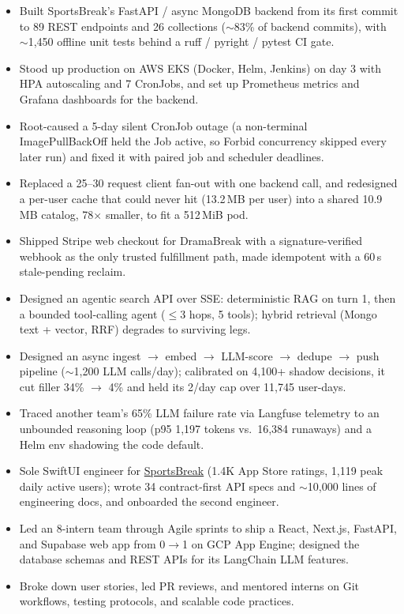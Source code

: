 \documentclass[11pt, letterpaper]{article}
\begin{document}
\begin{itemize}
  \item Built SportsBreak's FastAPI / async MongoDB backend from its first commit to 89 REST endpoints and 26 collections ($\sim$83\% of backend commits), with $\sim$1{,}450 offline unit tests behind a ruff / pyright / pytest CI gate.
  \item Stood up production on AWS EKS (Docker, Helm, Jenkins) on day 3 with HPA autoscaling and 7 CronJobs, and set up Prometheus metrics and Grafana dashboards for the backend.
  \item Root-caused a 5-day silent CronJob outage (a non-terminal ImagePullBackOff held the Job active, so Forbid concurrency skipped every later run) and fixed it with paired job and scheduler deadlines.
  \item Replaced a 25--30 request client fan-out with one backend call, and redesigned a per-user cache that could never hit (13.2\,MB per user) into a shared 10.9\,MB catalog, 78$\times$ smaller, to fit a 512\,MiB pod.
  \item Shipped Stripe web checkout for DramaBreak with a signature-verified webhook as the only trusted fulfillment path, made idempotent with a 60\,s stale-pending reclaim.
  \item Designed an agentic search API over SSE: deterministic RAG on turn 1, then a bounded tool-calling agent ($\le$3 hops, 5 tools); hybrid retrieval (Mongo text + vector, RRF) degrades to surviving legs.
  \item Designed an async ingest $\to$ embed $\to$ LLM-score $\to$ dedupe $\to$ push pipeline ($\sim$1{,}200 LLM calls/day); calibrated on 4{,}100+ shadow decisions, it cut filler 34\% $\to$ 4\% and held its 2/day cap over 11{,}745 user-days.
  \item Traced another team's 65\% LLM failure rate via Langfuse telemetry to an unbounded reasoning loop (p95 1{,}197 tokens vs.\ 16{,}384 runaways) and a Helm env shadowing the code default.
  \item Sole SwiftUI engineer for \href{https://apps.apple.com/app/id6762649287}{SportsBreak} (1.4K App Store ratings, 1{,}119 peak daily active users); wrote 34 contract-first API specs and $\sim$10{,}000 lines of engineering docs, and onboarded the second engineer.
\end{itemize}

\vspace{1pt}
\begin{itemize}
  \item Led an 8-intern team through Agile sprints to ship a React, Next.js, FastAPI, and Supabase web app from 0$\to$1 on GCP App Engine; designed the database schemas and REST APIs for its LangChain LLM features.
  \item Broke down user stories, led PR reviews, and mentored interns on Git workflows, testing protocols, and scalable code practices.
\end{itemize}
\end{document}
